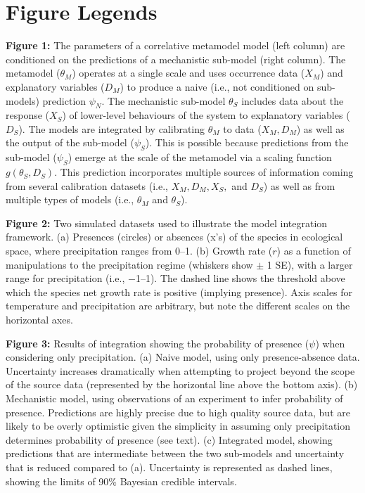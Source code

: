 \documentclass[11pt]{article}
\begin{document}
\section*{Figure Legends}
\begin{flushleft}

\textbf{Figure 1:} The parameters of a correlative metamodel model (left column) are conditioned on the predictions of a mechanistic sub-model (right column).
	The metamodel ($\theta_M$) operates at a single scale and uses occurrence data (\(X_M\)) and explanatory variables ($D_M$) to produce a naive (i.e., not conditioned on sub-models) prediction $\psi_N$.
	The mechanistic sub-model \(\theta_S\) includes data about the response (\(X_S\)) of lower-level behaviours of the system to explanatory variables ($D_S$). 
	The models are integrated by calibrating $\theta_M$ to data ($X_M, D_M$) as well as the output of the sub-model ($\psi_S$). 
	This is possible because predictions from the sub-model ($\psi_S$) emerge at the scale of the metamodel via a scaling function \(g(\theta_S, D_S)\).
	This prediction incorporates multiple sources of information coming from several calibration datasets (i.e., $X_M, D_M, X_S, $ and $D_S$) as well as from multiple types of models (i.e., $\theta_M$ and $\theta_S$).

\textbf{Figure 2:} Two simulated datasets used to illustrate the model integration framework.
	(a) Presences (circles) or absences (x's) of the species in ecological space, where precipitation ranges from 0--1.
	(b) Growth rate ($r$) as a function of manipulations to the precipitation regime (whiskers show $\pm$ 1 SE), with a larger range for precipitation (i.e., \(-\)1--1).
	The dashed line shows the threshold above which the species net growth rate is positive (implying presence).
	Axis scales for temperature and precipitation are arbitrary, but note the different scales on the horizontal axes.

\textbf{Figure 3:} Results of integration showing the probability of presence (\(\psi\)) when considering only precipitation.
	(a) Naive model, using only presence-absence data. Uncertainty increases dramatically when attempting to project beyond the scope of the source data (represented by the horizontal line above the bottom axis).
	(b) Mechanistic model, using observations of an experiment to infer probability of presence. Predictions are highly precise due to high quality source data, but are likely to be overly optimistic given the simplicity in assuming only precipitation determines probability of presence (see text).
	(c) Integrated model, showing predictions that are intermediate between the two sub-models and uncertainty that is reduced compared to (a).
	Uncertainty is represented as dashed lines, showing the limits of 90\% Bayesian credible intervals.


\end{flushleft}
\end{document}
